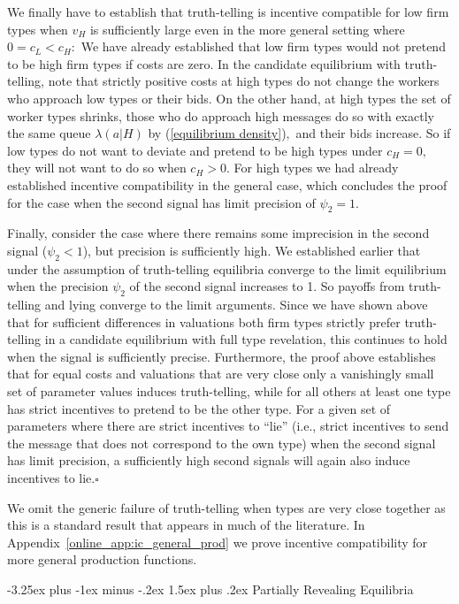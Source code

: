 \documentclass[12pt]{article}
\makeatletter
\renewcommand{\subsection}{%
  \@startsection{subsection}{2}{\z@}%
  {-3.25ex plus -1ex minus -.2ex}%
  {1.5ex plus .2ex}%
  {\normalfont\large\bfseries}%
}
\makeatother
\begin{document}
We finally have to establish that truth-telling is incentive compatible for
low firm types when $v_{H}$ is sufficiently large even in the more general
setting where $0=c_{L}<c_{H}:$ We have already established that low firm
types would not pretend to be high firm types if costs are zero. In the
candidate equilibrium with truth-telling, note that strictly positive costs
at high types do not change the workers who approach low types or their
bids. On the other hand, at high types the set of worker types shrinks,
those who do approach high messages do so with exactly the same queue $%
\lambda (a|H)$ by (\ref{equilibrium density})$,$ and their bids increase. So
if low types do not want to deviate and pretend to be high types under $%
c_{H}=0,$ they will not want to do so when $c_{H}>0.$ For high types we had
already established incentive compatibility in the general case, which
concludes the proof for the case when the second signal has limit precision of $\psi_2=1$. 

Finally, consider the case where there remains some imprecision in the second signal ($\psi_2 <1$), but precision is sufficiently high. We established earlier that under the assumption of truth-telling equilibria converge to the limit equilibrium when the precision $\psi_2$ of the second signal increases to 1. So payoffs from truth-telling and lying converge to the limit arguments. Since we have shown above that for sufficient differences in valuations both firm types strictly prefer truth-telling in a candidate equilibrium with full type revelation, this continues to hold when the signal is sufficiently precise. Furthermore, the proof above establishes that for equal costs and valuations that are very close only a vanishingly small set of parameter values induces truth-telling, while for all others at least one type has strict incentives to pretend to be the other type. For a given set of parameters where there are strict incentives to ``lie'' (i.e., strict incentives to send the message that does not correspond to the own type) when the second signal has limit precision, a sufficiently high second signals will again also induce incentives to lie.$\square $ 

\bigskip

We omit the generic failure of truth-telling when types are very close together as this is a standard result that appears in much of the literature. In Appendix~\ref{online_app:ic_general_prod} we prove incentive compatibility for more general production functions.


\subsection{Partially Revealing Equilibria}
\label{online_app:partially_revealing_eq}
\end{document}
